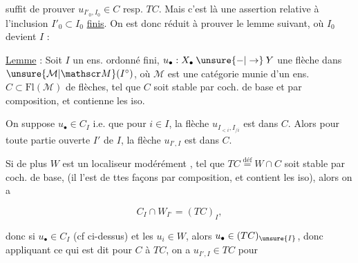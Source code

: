 
suffit de prouver $u_{I'_0,I_0}\in C$ resp. $TC$. Mais c’est là une assertion relative à l’inclusion   $I'_0\subset I_0$ \uline{finis}. On est donc réduit à prouver le lemme suivant, où $I_0$ devient $I$ :

\uline{Lemme} : Soit $I$ un ens. ordonné fini,  $u_\bullet:X_\bullet\mathbin{\unsure{-|\to}}Y$ une flèche dans $\unsure{\mathcal M|\mathscr M}(I^\circ)$, où $\mathcal M$ est une catégorie munie d’un ens. $C\subset\mathrm{Fl}(\mathcal M)$ de flèches, tel que $C$ soit stable par coch. de base et par \inserted{\unsure{(*)}} composition, et contienne les iso.

On suppose $u_\bullet\in C_I$ i.e. que pour $i\in I$, la flèche $u_{I_{<i},I_{/i}}$ est dans $C$. Alors pour toute partie ouverte $I'$ de $I$, la flèche $u_{I',I}$ est dans $C$.


 Si de plus $W$  est un localiseur modérément , tel que  $TC\overset{\text{déf}}{=}W\cap C$ soit stable par coch. de base,  (il l’est de ttes façons par composition, et contient les iso), alors on a

\[
 C_I\cap W_{I^\circ}=(TC)_I,
\]

donc si $u_\bullet\in C_I$ (cf ci-dessus) et les $u_i\in W$, alors $u_\bullet\in(TC)_{\unsure{I}}$, donc  appliquant ce qui est dit pour $C$ à $TC$, on a $u_{I',I}\in TC$ pour 

